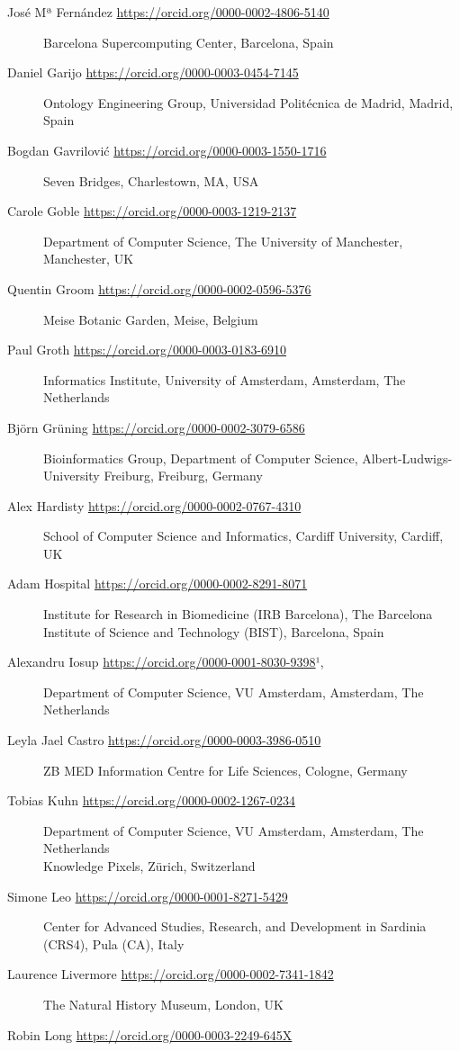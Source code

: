 \begin{description}
\item[José Mª Fernández \url{https://orcid.org/0000-0002-4806-5140}]
Barcelona Supercomputing Center, Barcelona, Spain
\item[Daniel Garijo \url{https://orcid.org/0000-0003-0454-7145}]
Ontology Engineering Group, Universidad Politécnica de Madrid, Madrid,
Spain
\item[Bogdan Gavrilović \url{https://orcid.org/0000-0003-1550-1716}]
Seven Bridges, Charlestown, MA, USA
\item[Carole Goble \url{https://orcid.org/0000-0003-1219-2137}]
Department of Computer Science, The University of Manchester,
Manchester, UK
\item[Quentin Groom \url{https://orcid.org/0000-0002-0596-5376}]
Meise Botanic Garden, Meise, Belgium
\item[Paul Groth \url{https://orcid.org/0000-0003-0183-6910}]
Informatics Institute, University of Amsterdam, Amsterdam, The
Netherlands
\item[Björn Grüning \url{https://orcid.org/0000-0002-3079-6586}]
Bioinformatics Group, Department of Computer Science,
Albert-Ludwigs-University Freiburg, Freiburg, Germany
\item[Alex Hardisty \url{https://orcid.org/0000-0002-0767-4310}]
School of Computer Science and Informatics, Cardiff University, Cardiff,
UK
\item[Adam Hospital \url{https://orcid.org/0000-0002-8291-8071}]
Institute for Research in Biomedicine (IRB Barcelona), The Barcelona
Institute of Science and Technology (BIST), Barcelona, Spain
\item[Alexandru Iosup \url{https://orcid.org/0000-0001-8030-9398}¹,]
Department of Computer Science, VU Amsterdam, Amsterdam, The Netherlands
\item[Leyla Jael Castro \url{https://orcid.org/0000-0003-3986-0510}]
ZB MED Information Centre for Life Sciences, Cologne, Germany
\item[Tobias Kuhn \url{https://orcid.org/0000-0002-1267-0234}]
Department of Computer Science, VU Amsterdam, Amsterdam, The Netherlands\\
Knowledge Pixels, Zürich, Switzerland
\item[Simone Leo \url{https://orcid.org/0000-0001-8271-5429}]
Center for Advanced Studies, Research, and Development in Sardinia
(CRS4), Pula (CA), Italy
\item[Laurence Livermore \url{https://orcid.org/0000-0002-7341-1842}]
The Natural History Museum, London, UK
\item[Robin Long \url{https://orcid.org/0000-0003-2249-645X}]

\end{description}
